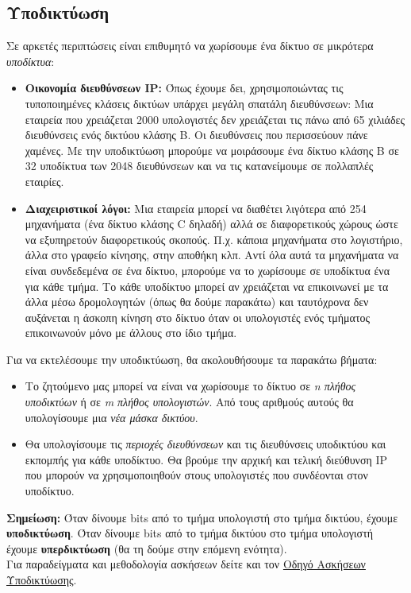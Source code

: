 %
%
\subsection{Υποδικτύωση}
Σε αρκετές περιπτώσεις είναι επιθυμητό να χωρίσουμε ένα δίκτυο σε μικρότερα \emph{υποδίκτυα}:

\begin{itemize}
\item \textbf{Οικονομία διευθύνσεων IP:} Όπως έχουμε δει, χρησιμοποιώντας τις τυποποιημένες κλάσεις δικτύων υπάρχει μεγάλη σπατάλη διευθύνσεων: Μια εταιρεία που χρειάζεται 2000 υπολογιστές δεν χρειάζεται τις πάνω από 65 χιλιάδες διευθύνσεις ενός δικτύου κλάσης Β. Οι διευθύνσεις που περισσεύουν πάνε χαμένες. Με την υποδικτύωση μπορούμε να μοιράσουμε ένα δίκτυο κλάσης Β σε 32 υποδίκτυα των 2048 διευθύνσεων και να τις κατανείμουμε σε πολλαπλές εταιρίες.
\item \textbf{Διαχειριστικοί λόγοι:} Μια εταιρεία μπορεί να διαθέτει λιγότερα από 254 μηχανήματα (ένα δίκτυο κλάσης C δηλαδή) αλλά σε διαφορετικούς χώρους ώστε να εξυπηρετούν διαφορετικούς σκοπούς. Π.χ. κάποια μηχανήματα στο λογιστήριο, άλλα στο γραφείο κίνησης, στην αποθήκη κλπ. Αντί όλα αυτά τα μηχανήματα να είναι συνδεδεμένα σε ένα δίκτυο, μπορούμε να το χωρίσουμε σε υποδίκτυα ένα για κάθε τμήμα. Το κάθε υποδίκτυο μπορεί αν χρειάζεται να επικοινωνεί με τα άλλα μέσω δρομολογητών (όπως θα δούμε παρακάτω) και ταυτόχρονα δεν αυξάνεται η άσκοπη κίνηση στο δίκτυο όταν οι υπολογιστές ενός τμήματος επικοινωνούν μόνο με άλλους στο ίδιο τμήμα.
\end{itemize}

Για να εκτελέσουμε την υποδικτύωση, θα ακολουθήσουμε τα παρακάτω βήματα:

\begin{itemize}
\item Το ζητούμενο μας μπορεί να είναι να χωρίσουμε το δίκτυο σε \emph{n πλήθος υποδικτύων} ή σε \emph{m πλήθος υπολογιστών}. Από τους αριθμούς αυτούς θα υπολογίσουμε μια \emph{νέα μάσκα δικτύου}.
\item Θα υπολογίσουμε τις \emph{περιοχές διευθύνσεων} και τις διευθύνσεις υποδικτύου και εκπομπής για κάθε υποδίκτυο. Θα βρούμε την αρχική και τελική διεύθυνση IP που μπορούν να χρησιμοποιηθούν στους υπολογιστές που συνδέονται στον υποδίκτυο.
\end{itemize}

\begin{inthebox}
\textbf{Σημείωση:} Όταν δίνουμε bits από το τμήμα υπολογιστή στο τμήμα δικτύου, έχουμε \textbf{υποδικτύωση}. Όταν δίνουμε bits από το τμήμα δικτύου στο τμήμα υπολογιστή έχουμε \textbf{υπερδικτύωση} (θα τη δούμε στην επόμενη ενότητα).\\
Για παραδείγματα και μεθοδολογία ασκήσεων δείτε και τον  \href{http://www.freebsdworld.gr/diktia/subnetting-guide.pdf}{Οδηγό Ασκήσεων Υποδικτύωσης}.\\
\end{inthebox}

